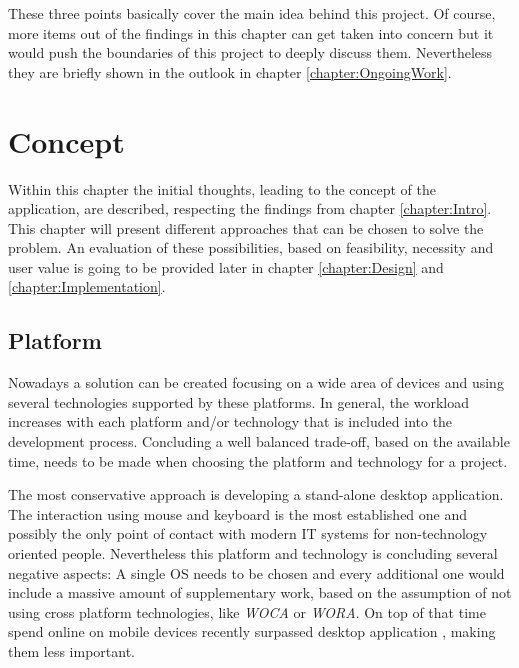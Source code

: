 These three points basically cover the main idea behind this project. Of course, more items out of the findings in this chapter can get taken into concern but it would push the boundaries of this project to deeply discuss them. Nevertheless they are briefly shown in the outlook in chapter \vref{chapter:OngoingWork}.

\chapter{Concept}
\label{chapter:Concept}
Within this chapter the initial thoughts, leading to the concept of the application, are described, respecting the findings from chapter \ref{chapter:Intro}. This chapter will present different approaches that can be chosen to solve the problem. An evaluation of these possibilities, based on feasibility, necessity and user value is going to be provided later in chapter \vref{chapter:Design} and \vref{chapter:Implementation}.

\section{Platform}
\label{sec:Platform}

Nowadays a solution can be created focusing on a wide area of devices and using several technologies supported by these platforms. In general, the workload increases with each platform and/or technology that is included into the development process. Concluding a well balanced trade-off, based on the available time, needs to be made when choosing the platform and technology for a project.

The most conservative approach is developing a stand-alone desktop application. The interaction using mouse and keyboard is the most established one and possibly the only point of contact with modern \gls{IT} systems for non-technology oriented people. Nevertheless this platform and technology is concluding several negative aspects: A single \gls{OS} needs to be chosen and every additional one would include a massive amount of supplementary work, based on the assumption of not using cross platform technologies, like \emph{\Acrfull{WOCA}} or \emph{\Acrfull{WORA}}. On top of that time spend online on mobile devices recently surpassed desktop application \cite{Murtagh:2014aa}, making them less important. 

